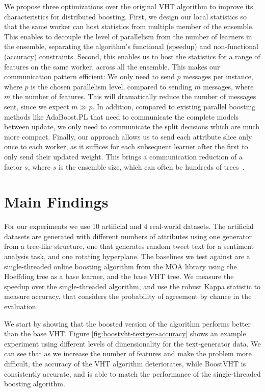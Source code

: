 We propose three optimizations over the original VHT algorithm to improve its
characteristics for distributed boosting. First, we design our local statistics
so that the same worker can host statistics from multiple member of the ensemble.
This enables to decouple the level of parallelism from the number of learners
in the ensemble, separating the algorithm's functional (speedup) and non-functional
(accuracy) constraints.
Second, this enables us to host the statistics for a range of features on the same
worker, across all the ensemble. This makes our communication pattern efficient:
We only need to send $p$  messages per instance, where $p$ is the chosen
parallelism level, compared to sending $m$ messages, where $m$ the
number of features. This will dramatically
reduce the number of messages sent, since we expect $m \gg p$. In addition, compared to existing
parallel boosting methods like AdaBoost.PL \cite{adaboost-pl} that need to communicate the complete
models between update, we only need to communicate the split decisions which are
much more compact.
Finally, our approach allows us to send each attribute slice only once to
each worker, as it suffices for each subsequent learner after the first
to only send their updated weight. This brings a communication reduction
of a factor $s$, where $s$ is the ensemble size, which can often be hundreds of
trees~\cite{hundreds-classifiers}.

\section{Main Findings}
\label{sec:boostvht-results}

For our experiments we use 10 artificial and 4 real-world datasets. The artificial
datasets are generated with different numbers of attributes using one generator
from a tree-like structure, one that generates random tweet text for a sentiment
analysis task, and one rotating hyperplane. The baselines we test against are
a single-threaded online boosting algorithm from the MOA \cite{bifet2010moa}
library using the Hoeffding tree as a base learner, and the base VHT tree.
We measure the speedup over the single-threaded algorithm, and use the
robust Kappa\cite{bifet2015efficient} statistic to measure accuracy,
that considers the probability of agreement by chance in the evaluation.

We start by showing that the boosted version of the algorithm performs
better than the base VHT. Figure \ref{fig:boostvht-textgen-accuracy} shows an example experiment using different
levels of dimensionality for the text-generator data. We can see
that as we increase the number of features and make the problem more
difficult, the accuracy of the VHT algorithm deteriorates, while
BoostVHT is consistently accurate, and is able to match the performance of the single-threaded
boosting algorithm.

